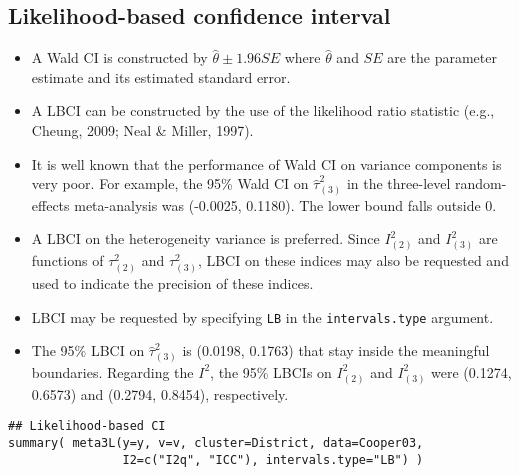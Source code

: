 \documentclass[11pt]{article}
\begin{document}
\subsection{Likelihood-based confidence interval}
\label{sec:org26b0d91}
\begin{itemize}
\item A Wald CI is constructed by \(\hat{\theta} \pm 1.96 SE\) where \(\hat{\theta}\) and \(SE\) are the parameter estimate and its estimated standard error.
\item A LBCI can be constructed by the use of the likelihood ratio statistic (e.g., Cheung, 2009; Neal \& Miller, 1997).
\item It is well known that the performance of Wald CI on variance components is very poor. For example, the 95\% Wald CI on \(\hat{\tau}^2_{(3)}\) in the three-level random-effects meta-analysis was (-0.0025, 0.1180). The lower bound falls outside 0.
\item A LBCI on the heterogeneity variance is preferred. Since \(I^2_{(2)}\) and \(I^2_{(3)}\) are functions of \(\tau^2_{(2)}\) and \(\tau^2_{(3)}\), LBCI on these indices may also be requested and used to indicate the precision of these indices.
\item LBCI may be requested by specifying \texttt{LB} in the \texttt{intervals.type} argument.
\item The 95\% LBCI on \(\hat{\tau}^2_{(3)}\) is (0.0198, 0.1763) that stay inside the meaningful boundaries. Regarding the \(I^2\), the 95\% LBCIs on \(I^2_{(2)}\) and \(I^2_{(3)}\) were (0.1274, 0.6573) and (0.2794, 0.8454), respectively.
\end{itemize}
\begin{verbatim}
## Likelihood-based CI
summary( meta3L(y=y, v=v, cluster=District, data=Cooper03, 
                I2=c("I2q", "ICC"), intervals.type="LB") ) 
\end{verbatim}
\end{document}
